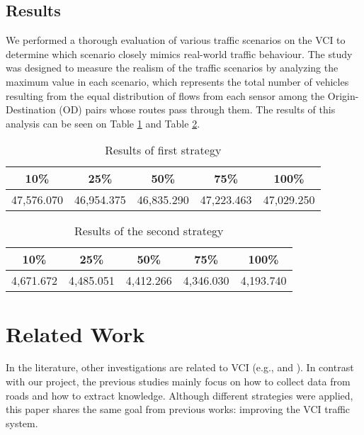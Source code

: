 \documentclass[conference]{IEEEtran}
\begin{document}
\subsection{Results}
\label{results}
We performed a thorough evaluation of various traffic scenarios on the VCI to determine which scenario closely mimics real-world traffic behaviour. The study was designed to measure the realism of the traffic scenarios by analyzing the maximum value in each scenario, which represents the total number of vehicles resulting from the equal distribution of flows from each sensor among the Origin-Destination (OD) pairs whose routes pass through them. The results of this analysis can be seen on Table \ref{table:results1} and Table \ref{table:results2}.

\begin{table}[h] 
\centering
\caption{Results of first strategy}\label{table:results1}
\begin{tabular}{|c|c|c|c|c|} 
\hline
\textbf{10\%} & \textbf{25\%} & \textbf{50\%} & \textbf{75\%} & \textbf{100\%} \\ [0.5ex] 
\hline
 47,576.070 & 46,954.375 & 46,835.290 & 47,223.463 & 47,029.250 \\ [1ex] 
\hline
\end{tabular}
\end{table}

\begin{table}[h] 
\centering
\caption{Results of the second strategy}\label{table:results2}
\begin{tabular}{|c|c|c|c|c|} 
\hline
\textbf{10\%} & \textbf{25\%} & \textbf{50\%} & \textbf{75\%} & \textbf{100\%} \\ [0.5ex] 
\hline
 4,671.672 & 4,485.051 & 4,412.266 & 4,346.030 & 4,193.740
 \\ [1ex] 
\hline
\end{tabular}
\end{table}

\section{Related Work}
In the literature, other investigations are related to VCI (e.g., \cite{Rossetti:predictionFlow} and \cite{Rossetti:mimicTraffic}). In contrast with our project, the previous studies mainly focus on how to collect data from roads and how to extract knowledge. Although different strategies were applied, this paper shares the same goal from previous works: improving the VCI traffic system. 
\end{document}
